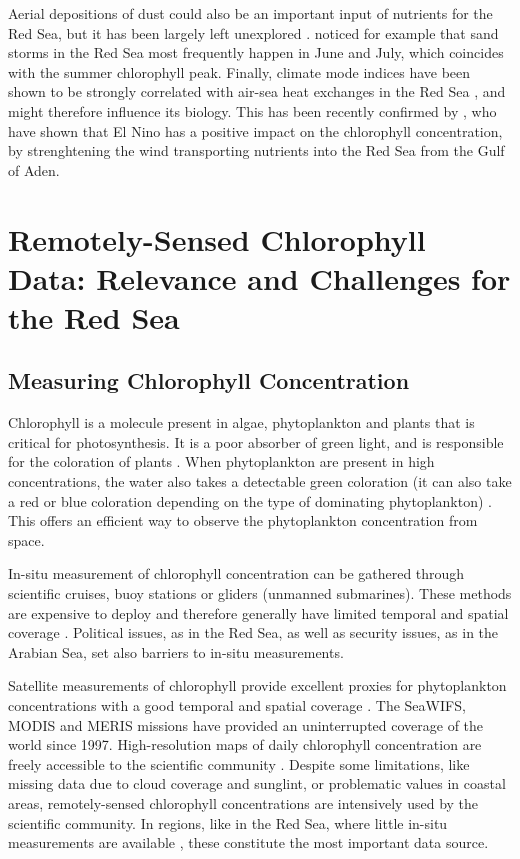 Aerial depositions of dust could also be an important input of nutrients for
the Red Sea, but it has been largely left unexplored \citep{Triantafyllou2014}.
\citet{Raitsos2013} noticed for example that sand storms in the Red Sea most
frequently happen in June and July, which coincides with the summer chlorophyll
peak. Finally, climate mode indices have been shown to be strongly correlated
with air-sea heat exchanges in the Red Sea \citep{Abulnaja2015}, and might
therefore influence its biology. This has been recently confirmed by
\citet{Raitsos2015}, who have shown that El Nino has a positive impact on the
chlorophyll concentration, by strenghtening the wind transporting nutrients
into the Red Sea from the Gulf of Aden.

\section{Remotely-Sensed Chlorophyll Data: Relevance and Challenges for the Red
Sea}

\subsection{Measuring Chlorophyll Concentration}

Chlorophyll is a molecule present in algae, phytoplankton and plants that is
critical for photosynthesis. It is a poor absorber of green light, and is
responsible for the coloration of plants \citep{Pal2014}. When phytoplankton
are present in high concentrations, the water also takes a detectable green
coloration (it can also take a red or blue coloration depending on the type of
dominating phytoplankton) \citep{Robinson2010}. This offers an efficient way to
observe the phytoplankton concentration from space.

In-situ measurement of chlorophyll concentration can be gathered through
scientific cruises, buoy stations or gliders (unmanned submarines). These
methods are expensive to deploy and therefore generally have limited temporal
and spatial coverage \citep{Robinson2010}. Political issues, as in the Red Sea,
as well as security issues, as in the Arabian Sea, set also barriers to in-situ
measurements.

Satellite measurements of chlorophyll provide excellent proxies for
phytoplankton concentrations with a good temporal and spatial coverage
\citep{Robinson2010}. The SeaWIFS, MODIS and MERIS missions have provided an
uninterrupted coverage of the world since 1997. High-resolution maps of daily
chlorophyll concentration are freely accessible to the scientific community
\citep{McClain2009}. Despite some limitations, like missing data due to cloud
coverage and sunglint, or problematic values in coastal areas, remotely-sensed
chlorophyll concentrations are intensively used by the scientific community. In
regions, like in the Red Sea, where little in-situ measurements are available
\citep{Raitsos2013, Brewin2013}, these constitute the most important data
source.


